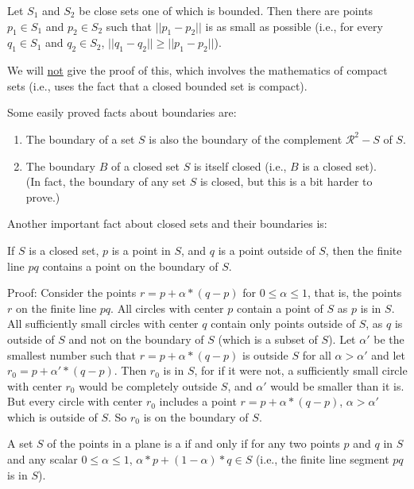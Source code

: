 \documentclass[12pt]{article}
\begin{document}
\begin{lemma}\label{MINIMUM-DISTANCE}
Let $S_1$ and $S_2$ be close sets one of which is bounded.
Then there are points
$p_1\in S_1$ and $p_2\in S_2$ such that $||p_1-p_2||$ is as
small as possible (i.e., for every $q_1\in S_1$ and $q_2\in S_2$,
$||q_1-q_2||\ge||p_1-p_2||$).
\end{lemma}

We will \underline{not} give the proof of this,
which involves the mathematics of compact
sets (i.e., uses the fact that a closed bounded set is compact).

Some easily proved facts about boundaries are:
\begin{enumerate}
\item The boundary of a set $S$ is also the boundary of the
complement $\mathcal{R}^2-S$ of $S$.
\item The boundary $B$ of a closed set $S$ is itself closed
(i.e., $B$ is a closed set). \\
(In fact, the boundary of any set $S$ is closed, but this is
a bit harder to prove.)

\end{enumerate}

Another important fact about closed sets and their boundaries is:

\begin{lemma}\label{BOUNDARY-CROSSING}
If $S$ is a closed set, $p$ is a point in $S$, and $q$ is a point
outside of $S$, then the finite line $pq$ contains a point on the
boundary of $S$.
\end{lemma}
\begin{indpar}{0.2in}
Proof: Consider the points $r=p+\alpha*(q-p)$ for $0\le\alpha\le 1$,
that is, the points $r$ on the finite line $pq$.
All circles with center $p$ contain a point of $S$ as $p$ is in $S$.
All sufficiently small circles with center $q$ contain only points
outside of $S$, as $q$ is outside of $S$ and not on the boundary of $S$
(which is a subset of $S$).  Let $\alpha'$ be the smallest number such
that $r=p+\alpha*(q-p)$ is outside $S$ for all $\alpha>\alpha'$ and
let $r_0=p+\alpha'*(q-p)$.  Then $r_0$ is in $S$, for if it were not,
a sufficiently small circle with center $r_0$ would be completely
outside $S$, and $\alpha'$ would be smaller than it is.  But every
circle with center $r_0$ includes a point $r=p+\alpha*(q-p)$,
$\alpha>\alpha'$ which
is outside of $S$.  So $r_0$ is on the boundary of $S$.
\end{indpar}

\begin{definition}
A set $S$ of the points in a plane
is a  if and only if for any two points $p$ and $q$ in $S$
and any scalar $0\le\alpha\le 1$,
$\alpha*p+(1-\alpha)*q \in S$
(i.e., the finite line segment $pq$ is in $S$).
\end{definition}
\end{document}
